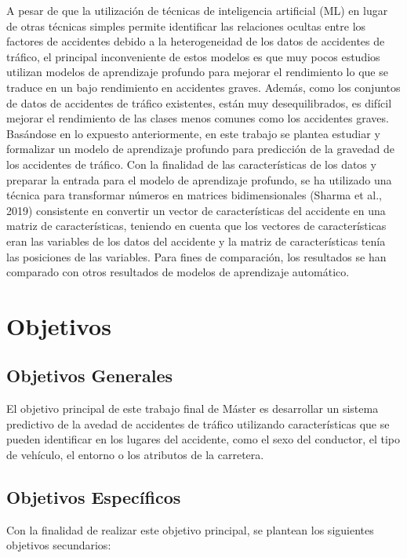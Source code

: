 	A pesar de que la utilización de técnicas de inteligencia artiﬁcial (ML) en lugar de otras técnicas simples permite identiﬁcar las relaciones ocultas entre los factores de accidentes debido a la heterogeneidad de los datos de accidentes de tráﬁco, el principal inconveniente de estos modelos es que muy pocos estudios utilizan modelos de aprendizaje profundo para mejorar el rendimiento lo que se traduce en un bajo rendimiento en  accidentes graves. Además, como los conjuntos de datos de accidentes de tráﬁco existentes, están muy desequilibrados, es difícil mejorar el rendimiento de las clases menos comunes como los accidentes graves. Basándose en lo expuesto anteriormente, en este trabajo se plantea estudiar y formalizar un modelo de aprendizaje profundo para predicción de la gravedad de los accidentes de tráﬁco. Con la ﬁnalidad de  las características de los datos y preparar la entrada para el modelo de aprendizaje profundo, se ha utilizado una técnica para transformar números en matrices bidimensionales (Sharma et al., 2019) consistente en convertir un vector de características del accidente en una matriz de características, teniendo en cuenta que los vectores de características eran las variables de los datos del accidente y la matriz de características tenía las posiciones de las variables. Para ﬁnes de comparación, los resultados se han comparado con otros resultados de modelos de aprendizaje automático.

\section {Objetivos}

	\subsection{Objetivos Generales}

		El objetivo principal de este trabajo final de Máster es desarrollar un sistema predictivo de la avedad de accidentes de tráfico utilizando características que se pueden identificar en los lugares del accidente, como el sexo del conductor, el tipo de vehículo, el entorno o los atributos de la carretera.

	\subsection{Objetivos Específicos}

		Con la finalidad de realizar este objetivo principal, se plantean los siguientes objetivos secundarios:

